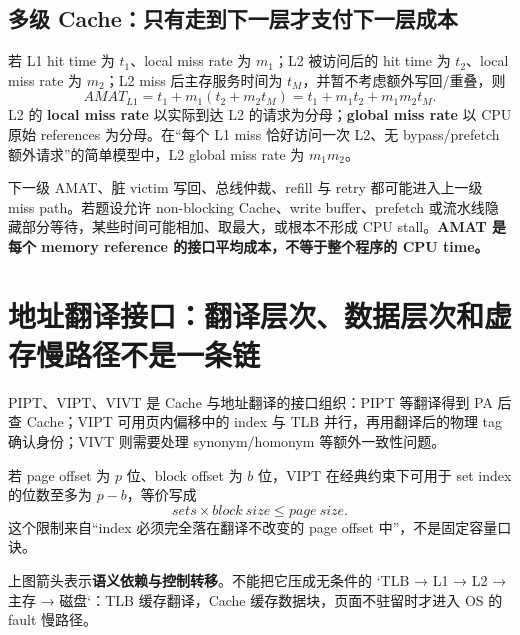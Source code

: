 \documentclass[UTF8,fontset=fandol,11pt,a4paper]{ctexart}
\newcommand{\kw}[1]{\textbf{\color{deep}#1}}\newcommand{\code}[1]{\texttt{#1}}
\begin{document}
\subsection{多级 Cache：只有走到下一层才支付下一层成本}
若 L1 hit time 为 $t_1$、local miss rate 为 $m_1$；L2 被访问后的 hit time 为 $t_2$、local miss rate 为 $m_2$；L2 miss 后主存服务时间为 $t_M$，并暂不考虑额外写回/重叠，则
\[
AMAT_{L1}=t_1+m_1\left(t_2+m_2t_M\right)
=t_1+m_1t_2+m_1m_2t_M.
\]
L2 的 \kw{local miss rate} 以实际到达 L2 的请求为分母；\kw{global miss rate} 以 CPU 原始 references 为分母。在“每个 L1 miss 恰好访问一次 L2、无 bypass/prefetch 额外请求”的简单模型中，L2 global miss rate 为 $m_1m_2$。

下一级 AMAT、脏 victim 写回、总线仲裁、refill 与 retry 都可能进入上一级 miss path。若题设允许 non-blocking Cache、write buffer、prefetch 或流水线隐藏部分等待，某些时间可能相加、取最大，或根本不形成 CPU stall。\kw{AMAT 是每个 memory reference 的接口平均成本，不等于整个程序的 CPU time。}

\section{地址翻译接口：翻译层次、数据层次和虚存慢路径不是一条链}
PIPT、VIPT、VIVT 是 Cache 与地址翻译的接口组织：PIPT 等翻译得到 PA 后查 Cache；VIPT 可用页内偏移中的 index 与 TLB 并行，再用翻译后的物理 tag 确认身份；VIVT 则需要处理 synonym/homonym 等额外一致性问题。

若 page offset 为 $p$ 位、block offset 为 $b$ 位，VIPT 在经典约束下可用于 set index 的位数至多为 $p-b$，等价写成
\[
sets\times block\ size\le page\ size.
\]
这个限制来自“index 必须完全落在翻译不改变的 page offset 中”，不是固定容量口诀。

\begin{center}
\end{center}
上图箭头表示\textbf{语义依赖与控制转移}。不能把它压成无条件的 `TLB → L1 → L2 → 主存 → 磁盘`：TLB 缓存翻译，Cache 缓存数据块，页面不驻留时才进入 OS 的 fault 慢路径。
\end{document}
